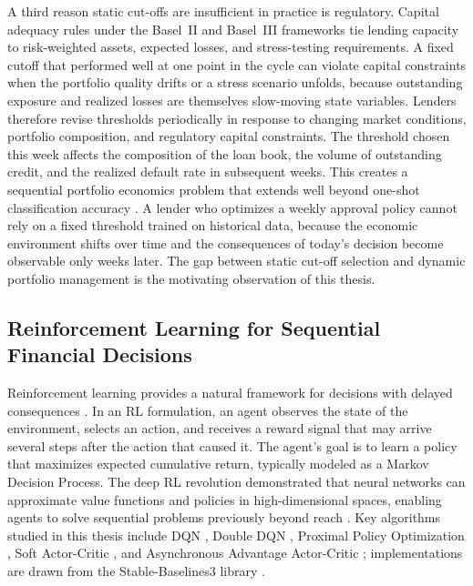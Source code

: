 \documentclass[12pt,a4paper]{article}
\begin{document}
A third reason static cut-offs are insufficient in practice is regulatory. Capital adequacy rules under the Basel~II and Basel~III frameworks tie lending capacity to risk-weighted assets, expected losses, and stress-testing requirements. A fixed cutoff that performed well at one point in the cycle can violate capital constraints when the portfolio quality drifts or a stress scenario unfolds, because outstanding exposure and realized losses are themselves slow-moving state variables. Lenders therefore revise thresholds periodically in response to changing market conditions, portfolio composition, and regulatory capital constraints. The threshold chosen this week affects the composition of the loan book, the volume of outstanding credit, and the realized default rate in subsequent weeks. This creates a sequential portfolio economics problem that extends well beyond one-shot classification accuracy \cite{bellotti2009}. A lender who optimizes a weekly approval policy cannot rely on a fixed threshold trained on historical data, because the economic environment shifts over time and the consequences of today's decision become observable only weeks later. The gap between static cut-off selection and dynamic portfolio management is the motivating observation of this thesis.

\subsection{Reinforcement Learning for Sequential Financial Decisions}

Reinforcement learning provides a natural framework for decisions with delayed consequences \cite{sutton2018, dayan2008}. In an RL formulation, an agent observes the state of the environment, selects an action, and receives a reward signal that may arrive several steps after the action that caused it. The agent's goal is to learn a policy that maximizes expected cumulative return, typically modeled as a Markov Decision Process. The deep RL revolution demonstrated that neural networks can approximate value functions and policies in high-dimensional spaces, enabling agents to solve sequential problems previously beyond reach \cite{arulkumaran2017}. Key algorithms studied in this thesis include DQN \cite{mnih2015dqn}, Double DQN \cite{van2016ddqn}, Proximal Policy Optimization \cite{schulman2017ppo}, Soft Actor-Critic \cite{haarnoja2018sac}, and Asynchronous Advantage Actor-Critic \cite{mnih2016a3c}; implementations are drawn from the Stable-Baselines3 library \cite{stable_baselines3}.
\end{document}
